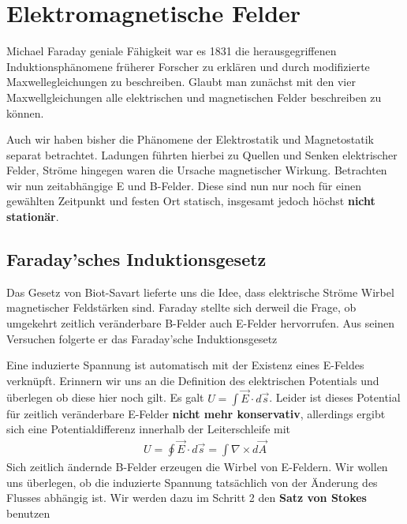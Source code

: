 \newpage
\section{Elektromagnetische Felder}

Michael Faraday geniale Fähigkeit war es 1831 die herausgegriffenen Induktionsphänomene früherer Forscher zu erklären und durch modifizierte Maxwellegleichungen zu beschreiben. Glaubt man zunächst mit den vier Maxwellgleichungen alle elektrischen und magnetischen Felder beschreiben zu können.  \par

Auch wir haben bisher die Phänomene der Elektrostatik und Magnetostatik separat betrachtet.
Ladungen führten hierbei zu Quellen und Senken elektrischer Felder, Ströme hingegen waren die Ursache magnetischer Wirkung.
Betrachten wir nun zeitabhängige E und B-Felder. Diese sind nun nur noch für einen gewählten Zeitpunkt und festen Ort statisch, insgesamt jedoch höchst \textbf{nicht stationär}. 
\subsection{Faraday'sches Induktionsgesetz}
Das Gesetz von Biot-Savart lieferte uns die Idee, dass elektrische Ströme Wirbel magnetischer Feldstärken sind.
Faraday stellte sich derweil die Frage, ob umgekehrt zeitlich veränderbare B-Felder auch E-Felder hervorrufen.
Aus seinen Versuchen folgerte er das Faraday'sche Induktionsgesetz
 

Eine induzierte Spannung ist automatisch mit der Existenz eines E-Feldes verknüpft. Erinnern wir uns an die Definition des elektrischen Potentials und überlegen ob diese hier noch gilt. Es galt $U = \int \vec{E} \cdot d\vec{s}$. Leider ist dieses Potential für zeitlich veränderbare E-Felder \textbf{nicht mehr konservativ}, allerdings ergibt sich eine Potentialdifferenz innerhalb der Leiterschleife mit
\begin{align*}
U = \oint \vec{E} \cdot d\vec{s} = \int \nabla \times d\vec{A}
\end{align*}
Sich zeitlich ändernde B-Felder erzeugen die Wirbel von E-Feldern. Wir wollen uns überlegen, ob die induzierte Spannung tatsächlich von der Änderung des Flusses abhängig ist.
Wir werden dazu im Schritt 2 den \textbf{Satz von Stokes} benutzen

